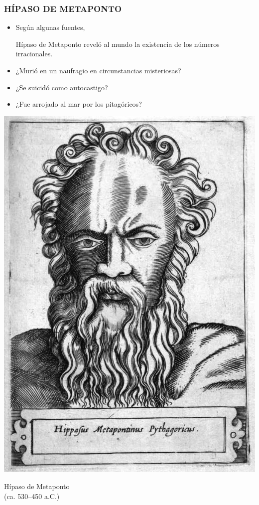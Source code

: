 \begin{frame}
  \frametitle{HÍPASO DE METAPONTO}

  \begin{minipage}[t][0.6\textheight]{0.6\textwidth}
    \vspace{0pt}
    \begin{itemize}
    \item<2-> Según algunas fuentes,

      Hípaso de Metaponto reveló al mundo la
      existencia de los números irracionales.

    \item<3-> ¿Murió en un naufragio en circunstancias misteriosas?

    \item<4-> ¿Se suicidó como autocastigo?

    \item<5-> ¿Fue arrojado al mar por los pitagóricos?
    \end{itemize}

  \end{minipage}
  \begin{minipage}[t]{0.35\textwidth}
    \vspace{0pt}\flushright
        \includegraphics[width=.9\textwidth]{pic/hipaso.jpg}

        Hípaso de Metaponto\\
        (ca. 530--450 a.C.)
  \end{minipage}
\end{frame}

